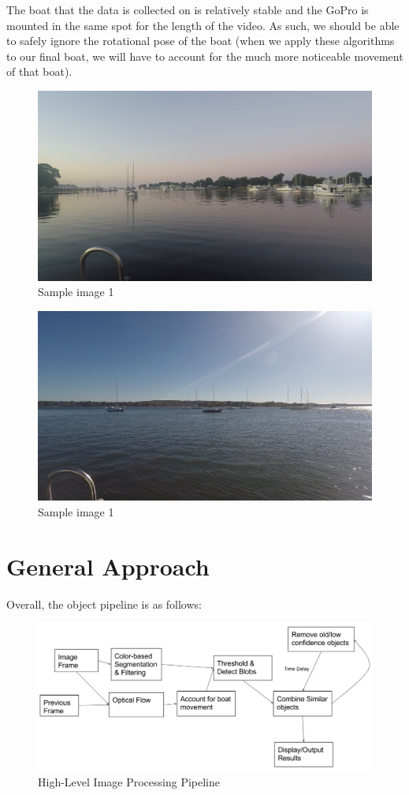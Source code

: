 \documentclass{article}
\begin{document}
The boat that the data is collected on is relatively stable
and the GoPro is mounted in the same spot for the length
of the video. As such, we should be able to safely ignore
the rotational pose of the boat (when we apply these
algorithms to our final boat, we will have to account for
the much more noticeable movement of that boat).

\begin{figure}[H]
\includegraphics[width=12cm]{sample1}
\centering
\caption{Sample image 1}
\end{figure}
\begin{figure}[H]
\includegraphics[width=12cm]{sample2}
\centering
\caption{Sample image 1}
\end{figure}


\section{General Approach}

Overall, the object pipeline is as follows:
\begin{figure}[H]
\includegraphics[width=16cm]{algorithm_flowchart}
\centering
\caption{High-Level Image Processing Pipeline}
\end{figure}
\end{document}
